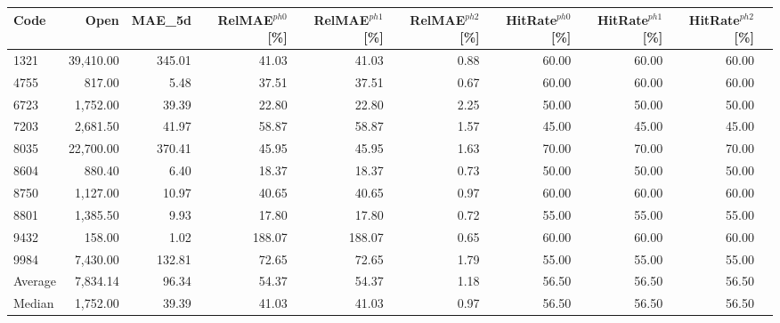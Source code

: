 \begingroup
\footnotesize
\begin{tabular}{lrrrrrrrrr}
\hline
Code & Open & MAE\_5d & RelMAE$^{ph0}$[\%] & RelMAE$^{ph1}$[\%] & RelMAE$^{ph2}$[\%] & HitRate$^{ph0}$[\%] & HitRate$^{ph1}$[\%] & HitRate$^{ph2}$[\%] \\
\hline
1321 & 39,410.00 & 345.01 & 41.03 & 41.03 & 0.88 & 60.00 & 60.00 & 60.00 \\
4755 & 817.00 & 5.48 & 37.51 & 37.51 & 0.67 & 60.00 & 60.00 & 60.00 \\
6723 & 1,752.00 & 39.39 & 22.80 & 22.80 & 2.25 & 50.00 & 50.00 & 50.00 \\
7203 & 2,681.50 & 41.97 & 58.87 & 58.87 & 1.57 & 45.00 & 45.00 & 45.00 \\
8035 & 22,700.00 & 370.41 & 45.95 & 45.95 & 1.63 & 70.00 & 70.00 & 70.00 \\
8604 & 880.40 & 6.40 & 18.37 & 18.37 & 0.73 & 50.00 & 50.00 & 50.00 \\
8750 & 1,127.00 & 10.97 & 40.65 & 40.65 & 0.97 & 60.00 & 60.00 & 60.00 \\
8801 & 1,385.50 & 9.93 & 17.80 & 17.80 & 0.72 & 55.00 & 55.00 & 55.00 \\
9432 & 158.00 & 1.02 & 188.07 & 188.07 & 0.65 & 60.00 & 60.00 & 60.00 \\
9984 & 7,430.00 & 132.81 & 72.65 & 72.65 & 1.79 & 55.00 & 55.00 & 55.00 \\
Average & 7,834.14 & 96.34 & 54.37 & 54.37 & 1.18 & 56.50 & 56.50 & 56.50 \\
Median & 1,752.00 & 39.39 & 41.03 & 41.03 & 0.97 & 56.50 & 56.50 & 56.50 \\
\hline
\end{tabular}
\endgroup